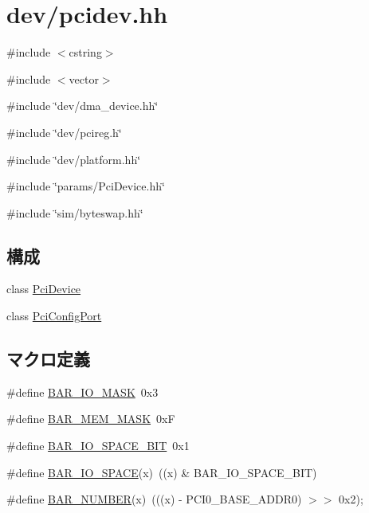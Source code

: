 \hypertarget{pcidev_8hh}{
\section{dev/pcidev.hh}
\label{pcidev_8hh}
}
{\ttfamily \#include $<$cstring$>$}\par
{\ttfamily \#include $<$vector$>$}\par
{\ttfamily \#include \char`\"{}dev/dma\_\-device.hh\char`\"{}}\par
{\ttfamily \#include \char`\"{}dev/pcireg.h\char`\"{}}\par
{\ttfamily \#include \char`\"{}dev/platform.hh\char`\"{}}\par
{\ttfamily \#include \char`\"{}params/PciDevice.hh\char`\"{}}\par
{\ttfamily \#include \char`\"{}sim/byteswap.hh\char`\"{}}\par
\subsection*{構成}
\begin{DoxyCompactItemize}
\item 
class \hyperlink{classPciDevice}{PciDevice}
\item 
class \hyperlink{classPciDevice_1_1PciConfigPort}{PciConfigPort}
\end{DoxyCompactItemize}
\subsection*{マクロ定義}
\begin{DoxyCompactItemize}
\item 
\#define \hyperlink{pcidev_8hh_adb92e77e41df55f5ddbacc4cd6379d8f}{BAR\_\-IO\_\-MASK}~0x3
\item 
\#define \hyperlink{pcidev_8hh_aeeff9164615dba258d21ae649d024780}{BAR\_\-MEM\_\-MASK}~0xF
\item 
\#define \hyperlink{pcidev_8hh_a131d2132bbf95f2e6b4b0393aacefb6c}{BAR\_\-IO\_\-SPACE\_\-BIT}~0x1
\item 
\#define \hyperlink{pcidev_8hh_a9856c7a546f6e7459d7f01174babb106}{BAR\_\-IO\_\-SPACE}(x)~((x) \& BAR\_\-IO\_\-SPACE\_\-BIT)
\item 
\#define \hyperlink{pcidev_8hh_a56edbfa92e6d6b7c11041ffe33121e9f}{BAR\_\-NUMBER}(x)~(((x) -\/ PCI0\_\-BASE\_\-ADDR0) $>$$>$ 0x2);
\end{DoxyCompactItemize}



